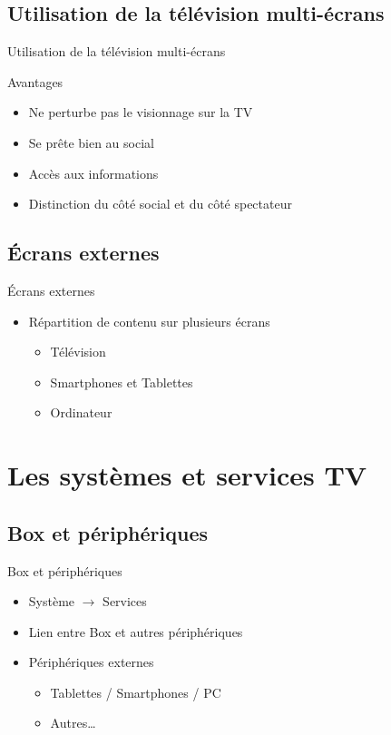 \documentclass{beamer}
\begin{document}
	\subsection{Utilisation de la télévision multi-écrans}
	\begin{frame}{Utilisation de la télévision multi-écrans}
		\begin{exampleblock}{Avantages}
			\begin{itemize}
				\item Ne perturbe pas le visionnage sur la TV
				\item Se prête bien au social
				\item Accès aux informations
				\item Distinction du côté social et du côté spectateur
			\end{itemize}
		\end{exampleblock}
	\end{frame}
	\subsection{Écrans externes}
	\begin{frame}{Écrans externes}
\begin{itemize}
	\item Répartition de contenu sur plusieurs écrans
		\begin{itemize}
			\item Télévision
			\item Smartphones et Tablettes
			\item Ordinateur
		\end{itemize}
\end{itemize}
	\end{frame}
	\section{Les systèmes et services TV}
	\subsection{Box et périphériques}
	\begin{frame}{Box et périphériques}
		\begin{itemize}
			\item Système $\rightarrow$ Services
			\item Lien entre Box et autres périphériques
			\item Périphériques externes
				\begin{itemize}
					\item Tablettes / Smartphones / PC
					\item Autres\ldots
				\end{itemize}
		\end{itemize}
	\end{frame}
\end{document}
